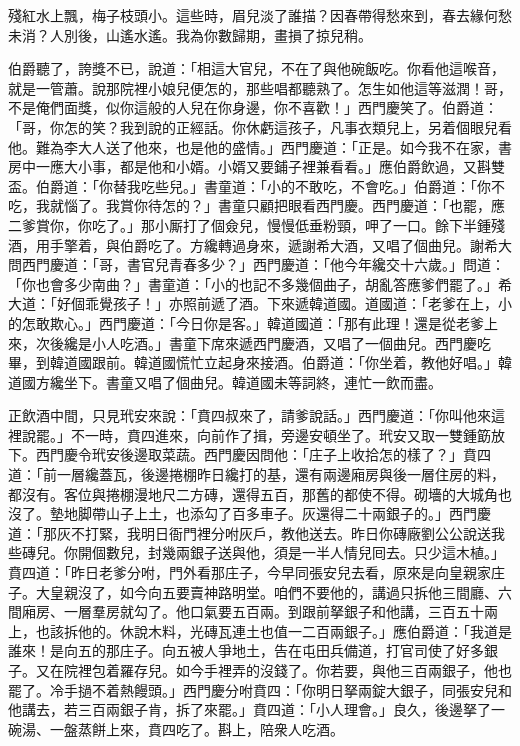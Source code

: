 \begin{myquote} 
殘紅水上飄，梅子枝頭小。這些時，眉兒淡了誰描？因春帶得愁來到，春去緣何愁未消？人別後，山遙水遙。我為你數歸期，畫損了掠兒稍。
\end{myquote} 

伯爵聽了，誇獎不已，說道：「相這大官兒，不在了與他碗飯吃。你看他這喉音，就是一管蕭。說那院裡小娘兒便怎的，那些唱都聽熟了。怎生如他這等滋潤！哥，不是俺們面獎，似你這般的人兒在你身邊，你不喜歡！」西門慶笑了。伯爵道：「哥，你怎的笑？我到說的正經話。{}你休虧這孩子，凡事衣類兒上，另着個眼兒看他。難為李大人送了他來，也是他的盛情。」西門慶道：「正是。如今我不在家，書房中一應大小事，都是他和小婿。小婿又要鋪子裡兼看看。」應伯爵飲過，又斟雙盃。伯爵道：「你替我吃些兒。」書童道：「小的不敢吃，不會吃。」伯爵道：「你不吃，我就惱了。我賞你待怎的？」書童只顧把眼看西門慶。西門慶道：「也罷，應二爹賞你，你吃了。」那小厮打了個僉兒，慢慢低垂粉頸，呷了一口。餘下半鍾殘酒，用手擎着，與伯爵吃了。方纔轉過身來，遞謝希大酒，又唱了個曲兒。謝希大問西門慶道：「哥，書官兒青春多少？」西門慶道：「他今年纔交十六歲。」問道：「你也會多少南曲？」書童道：「小的也記不多幾個曲子，胡亂答應爹們罷了。」希大道：「好個乖覺孩子！」亦照前遞了酒。下來遞韓道國。道國道：「老爹在上，小的怎敢欺心。」西門慶道：「今日你是客。」韓道國道：「那有此理！還是從老爹上來，次後纔是小人吃酒。」書童下席來遞西門慶酒，又唱了一個曲兒。西門慶吃畢，到韓道國跟前。韓道國慌忙立起身來接酒。伯爵道：「你坐着，教他好唱。」韓道國方纔坐下。書童又唱了個曲兒。韓道國未等詞終，連忙一飲而盡。

正飲酒中間，只見玳安來說：「賁四叔來了，請爹說話。」西門慶道：「你叫他來這裡說罷。」不一時，賁四進來，向前作了揖，旁邊安頓坐了。玳安又取一雙鍾筯放下。西門慶令玳安後邊取菜蔬。西門慶因問他：「庄子上收拾怎的樣了？」賁四道：「前一層纔蓋瓦，後邊捲棚昨日纔打的基，還有兩邊廂房與後一層住房的料，都沒有。客位與捲棚漫地尺二方磚，還得五百，那舊的都使不得。砌墻的大城角也沒了。墊地脚帶山子上土，也添勾了百多車子。灰還得二十兩銀子的。」西門慶道：「那灰不打緊，我明日衙門裡分咐灰戶，教他送去。昨日你磚廠劉公公說送我些磚兒。你開個數兒，封幾兩銀子送與他，須是一半人情兒囘去。只少這木植。」賁四道：「昨日老爹分咐，門外看那庄子，今早同張安兒去看，原來是向皇親家庄子。大皇親沒了，如今向五要賣神路明堂。咱們不要他的，講過只拆他三間廳、六間廂房、一層羣房就勾了。他口氣要五百兩。到跟前拏銀子和他講，三百五十兩上，也該拆他的。休說木料，光磚瓦連土也值一二百兩銀子。」應伯爵道：「我道是誰來！是向五的那庄子。向五被人爭地土，告在屯田兵備道，打官司使了好多銀子。又在院裡包着羅存兒。如今手裡弄的沒錢了。你若要，與他三百兩銀子，他也罷了。冷手撾不着熱饅頭。」西門慶分咐賁四：「你明日拏兩錠大銀子，同張安兒和他講去，若三百兩銀子肯，拆了來罷。」賁四道：「小人理會。」良久，後邊拏了一碗湯、一盤蒸餅上來，賁四吃了。斟上，陪衆人吃酒。

